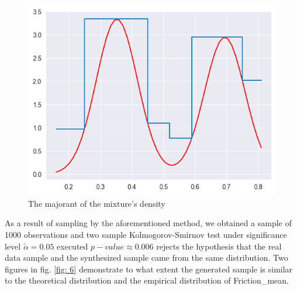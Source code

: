\documentclass[12pt, bachelor, substylefile = algo_title.rtx]{disser}
\theoremstyle{definition}
\begin{document}
\begin{figure}[!h]
\centering
   \begin{minipage}{0.7\textwidth}
     \includegraphics[width=\linewidth]{major}
   \end{minipage}
\caption{The majorant of the mixture's density}
\label{fig: 5}
\end{figure}

As a result of sampling by the aforementioned method, we obtained a sample of 1000 observations and two sample Kolmogorov-Smirnov test under significance level $\widetilde{\alpha} = 0.05$ executed $p-value \approx 0.006$ rejects the hypothesis that the real data sample and the synthesized sample came from the same distribution. 
Two figures in fig. \ref{fig: 6} demonstrate to what extent the generated sample is similar to the theoretical distribution and the empirical distribution of Friction\_mean.
\end{document}

